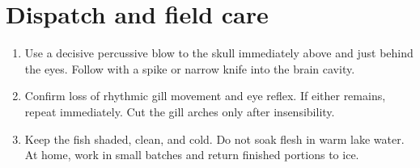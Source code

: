 \section{Dispatch and field care}
\begin{center}
\end{center}
\begin{enumerate}
\item Use a decisive percussive blow to the skull immediately above and just
behind the eyes. Follow with a spike or narrow knife into the brain cavity.
\item Confirm loss of rhythmic gill movement and eye reflex. If either remains,
repeat immediately. Cut the gill arches only after insensibility.
\item Keep the fish shaded, clean, and cold. Do not soak flesh in warm lake
water. At home, work in small batches and return finished portions to ice.
\end{enumerate}

\newpage

